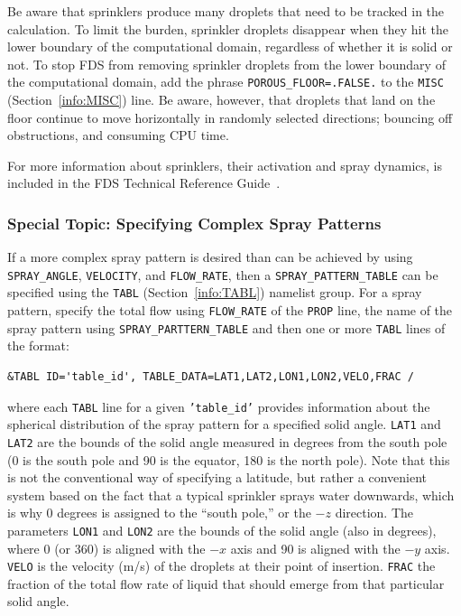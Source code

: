 \documentclass[11pt]{book}
\newcommand{\ct}{\tt\small}
\begin{document}
\noindent
Be aware that sprinklers produce many droplets that need to be
tracked in the calculation. To limit the burden, sprinkler droplets disappear when they hit the
lower boundary of the computational domain, regardless of whether it is solid
or not. To stop FDS from removing sprinkler droplets from the lower boundary of the computational domain,
add the phrase {\ct POROUS\_FLOOR=.FALSE.} to the {\ct MISC} (Section~\ref{info:MISC}) line. Be aware, however, that
droplets that land on the floor continue to move horizontally in randomly selected
directions; bouncing off obstructions, and consuming CPU time.

\noindent
For more information about sprinklers, their activation and spray dynamics, is included in the FDS
Technical Reference Guide~\cite{FDS_Tech_Guide_5}.

\subsubsection{Special Topic: Specifying Complex Spray Patterns}
\label{info:spraypattern}

If a more complex spray pattern is desired than can be achieved by using {\ct SPRAY\_ANGLE}, {\ct VELOCITY},
and {\ct FLOW\_RATE}, then a {\ct SPRAY\_PATTERN\_TABLE} can be specified using the {\ct TABL} (Section~\ref{info:TABL})
namelist group.  For a spray pattern, specify the total flow using {\ct FLOW\_RATE} of the {\ct PROP} line, the name of the spray pattern using
{\ct SPRAY\_PARTTERN\_TABLE} and then one or more {\ct TABL} lines of the format:

\footnotesize
\begin{verbatim}
&TABL ID='table_id', TABLE_DATA=LAT1,LAT2,LON1,LON2,VELO,FRAC /
\end{verbatim} \normalsize

\noindent
where each {\ct TABL} line for a given {\ct 'table\_id'} provides information about the spherical distribution of the spray pattern
for a specified solid angle. {\ct LAT1} and {\ct LAT2} are the bounds of the solid angle measured in degrees from
the south pole (0 is the south pole and 90 is the equator, 180 is the north pole).  Note that this is not the conventional way of
specifying a latitude, but rather a convenient system based on the fact that a typical sprinkler sprays water downwards, which is
why 0 degrees is assigned to the ``south pole,'' or the $-z$ direction. The parameters {\ct LON1} and {\ct LON2} are the
bounds of the solid angle (also in degrees),
where 0 (or 360) is aligned with the $-x$ axis and 90 is aligned with the $-y$ axis.  {\ct VELO} is the velocity (m/s) of the droplets at their
point of insertion.
{\ct FRAC} the fraction of the total flow rate of liquid that should emerge from that particular solid angle.
\end{document}
